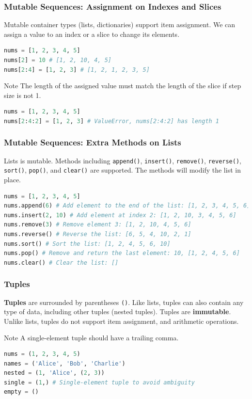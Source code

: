 \documentclass[beamer, en, version=2.0]{huangfusl-template}
\begin{document}
    \begin{frame}[fragile]
        \frametitle{Mutable Sequences: Assignment on Indexes and Slices}

        Mutable container types (lists, dictionaries) support item assignment. We can assign a value to an index or a slice to change its elements.

\begin{lstlisting}[language=python]
nums = [1, 2, 3, 4, 5]
nums[2] = 10 # [1, 2, 10, 4, 5]
nums[2:4] = [1, 2, 3] # [1, 2, 1, 2, 3, 5]
\end{lstlisting}

        \begin{block}{Note}
            The length of the assigned value must match the length of the slice if step size is not 1.

\begin{lstlisting}[language=python]
nums = [1, 2, 3, 4, 5]
nums[2:4:2] = [1, 2, 3] # ValueError, nums[2:4:2] has length 1
\end{lstlisting}
        \end{block}
    \end{frame}
    \begin{frame}[fragile]
        \frametitle{Mutable Sequences: Extra Methods on Lists}

        Lists is mutable. Methods including {\footnotesize\verb|append()|}, {\footnotesize\verb|insert()|}, {\footnotesize\verb|remove()|}, {\footnotesize\verb|reverse()|}, {\footnotesize\verb|sort()|}, {\footnotesize\verb|pop()|}, and {\footnotesize\verb|clear()|} are supported. The methods will modify the list in place.

\begin{lstlisting}[language=python]
nums = [1, 2, 3, 4, 5]
nums.append(6) # Add element to the end of the list: [1, 2, 3, 4, 5, 6]
nums.insert(2, 10) # Add element at index 2: [1, 2, 10, 3, 4, 5, 6]
nums.remove(3) # Remove element 3: [1, 2, 10, 4, 5, 6]
nums.reverse() # Reverse the list: [6, 5, 4, 10, 2, 1]
nums.sort() # Sort the list: [1, 2, 4, 5, 6, 10]
nums.pop() # Remove and return the last element: 10, [1, 2, 4, 5, 6]
nums.clear() # Clear the list: []
\end{lstlisting}
    \end{frame}
    \begin{frame}[fragile]
        \frametitle{Tuples}

        \textbf{Tuples} are surrounded by parentheses {\footnotesize\verb|()|}. Like lists, tuples can also contain any type of data, including other tuples (nested tuples). Tuples are \textbf{immutable}. Unlike lists, tuples do not support item assignment, and arithmetic operations.

        \begin{block}{Note}
            A single-element tuple should have a trailing comma.
        \end{block}

\begin{lstlisting}[language=python]
nums = (1, 2, 3, 4, 5)
names = ('Alice', 'Bob', 'Charlie')
nested = (1, 'Alice', (2, 3))
single = (1,) # Single-element tuple to avoid ambiguity
empty = ()
\end{lstlisting}
    \end{frame}
\end{document}
